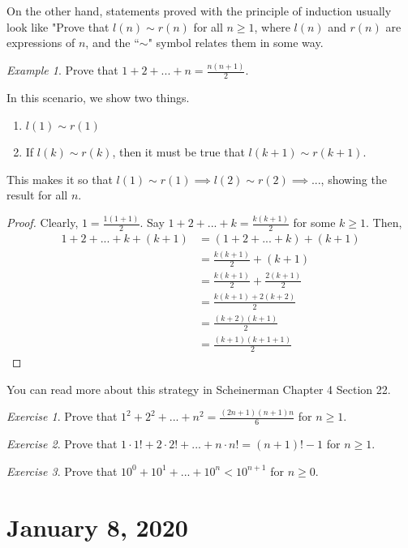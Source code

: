 \documentclass[11pt]{article}
\theoremstyle{plain}
\theoremstyle{definition}
\theoremstyle{remark}
\newtheorem{exm}{Example}[section]
\newtheorem{exc}{Exercise}[section]
\begin{document}
On the other hand, statements proved with the principle of induction usually look like "Prove that $l(n) \sim r(n)$ for all $n \geq 1$, where $l(n)$ and $r(n)$ are expressions of $n$, and the ``$\sim$" symbol relates them in some way.
\begin{exm}
    Prove that $1 + 2 + ... + n = \frac{n(n+1)}{2}$.
\end{exm}
In this scenario, we show two things.
\begin{enumerate}
    \item $l(1) \sim r(1)$
    \item If $l(k) \sim r(k)$, then it must be true that $l(k+1) \sim r(k+1)$.
\end{enumerate}
This makes it so that $l(1) \sim r(1) \implies l(2) \sim r(2) \implies ...$, showing the result for all $n$.
\begin{proof}
    Clearly, $1 = \frac{1(1+1)}{2}$. Say $1 + 2 + ... + k = \frac{k(k+1)}{2}$ for some $k \geq 1$. Then,
    \begin{align*}
        1 + 2 + ... + k + (k+1) &= (1 + 2 + ... + k) + (k+1)\\
        &= \frac{k(k+1)}{2} + (k+1)\\
        &= \frac{k(k+1)}{2} + \frac{2(k+1)}{2}\\
        &= \frac{k(k+1) + 2(k+2)}{2}\\
        &= \frac{(k+2)(k+1)}{2}\\
        &= \frac{(k+1)(k+1+1)}{2}
    \end{align*}
\end{proof}
You can read more about this strategy in Scheinerman Chapter 4 Section 22.

\begin{exc}
    Prove that $1^2 + 2^2 + ... +n^2 = \frac{(2n+1)(n+1)n}{6}$ for $n \geq 1$.
\end{exc}
\begin{exc}
    Prove that $1\cdot 1! + 2\cdot 2! + ... + n \cdot n! = (n+1)! - 1$ for $n \geq 1$.
\end{exc}
\begin{exc}
    Prove that $10^0 + 10^1 + ... +10^n < 10^{n+1}$ for $n \geq 0$.
\end{exc}

\section{January 8, 2020}
\end{document}
